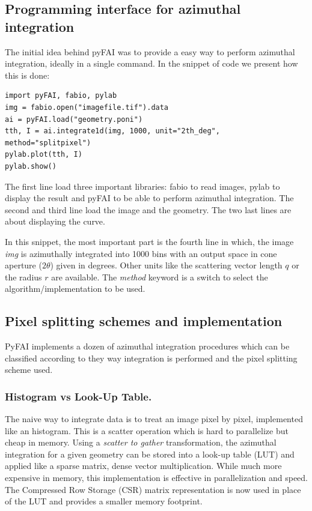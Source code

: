 \documentclass[preprint]{iucr}
\begin{document}
\subsection{Programming interface for azimuthal integration}

The initial idea behind pyFAI was to provide a easy way to perform azimuthal
integration, ideally in a single command. In the snippet of code we present how
this is done:

\begin{verbatim}
import pyFAI, fabio, pylab
img = fabio.open("imagefile.tif").data
ai = pyFAI.load("geometry.poni")
tth, I = ai.integrate1d(img, 1000, unit="2th_deg", method="splitpixel")
pylab.plot(tth, I)
pylab.show()
\end{verbatim}

The first line load three important libraries: fabio \cite{fabio} to read
images, pylab \cite{matplotlib} to display the result and pyFAI to be able to
perform azimuthal integration.
The second and third line load the image and the geometry.
The two last lines are about displaying the curve.

In this snippet, the most important part is the fourth line in which, the image
\textit{img} is azimuthally integrated into 1000 bins with an output space in
cone aperture ($2\theta$) given in degrees. Other
units like the scattering vector length $q$ or the radius $r$ are available.
The \textit{method} keyword is a switch to select the algorithm/implementation
to be used.

\subsection{Pixel splitting schemes and implementation}

PyFAI implements a dozen of azimuthal integration procedures which can be
classified according to they way integration is performed and the pixel
splitting scheme used.

\subsubsection{Histogram vs Look-Up Table.}
The naive way to integrate data is to treat an image pixel by pixel,
implemented like an histogram. This is a scatter operation which is hard to
parallelize but cheap in memory.
Using a \textit{scatter to gather} transformation, the azimuthal integration for
a given geometry can be stored into a look-up table (LUT) and applied like a
sparse matrix, dense vector multiplication.
While much more expensive in memory, this
implementation is effective in parallelization and speed.
The Compressed Row Storage (CSR) matrix representation is now used in place of
the LUT and provides a smaller memory footprint.
\end{document}
